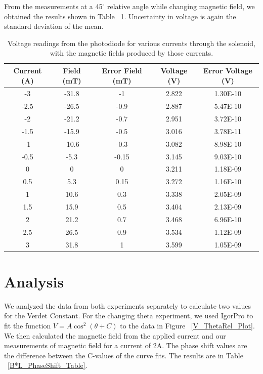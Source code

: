 \documentclass[prb,preprint]{revtex4-1}
\begin{document}
From the measurements at a 45$^{\circ}$ relative angle while changing magnetic field, we obtained the results shown in Table ~\ref{V_I_Table}. Uncertainty in voltage is again the standard deviation of the mean.

\begin{table}[h!]
\centering
\caption{Voltage readings from the photodiode for various currents through the solenoid, with the magnetic fields produced by those currents. }
\begin{ruledtabular}
\begin{tabular}{c c c c c}
Current (A) & Field (mT) & Error Field (mT) & Voltage (V) & Error Voltage (V)\\
\hline	%
-3   & -31.8 & -1 & 2.822 & 1.30E-10 \\
-2.5 & -26.5 & -0.9 & 2.887 & 5.47E-10 \\
-2   & -21.2 & -0.7 & 2.951 & 3.72E-10 \\
-1.5 & -15.9 & -0.5 & 3.016 & 3.78E-11 \\
-1   & -10.6 & -0.3 & 3.082 & 8.98E-10 \\
-0.5 & -5.3 & -0.15 & 3.145 & 9.03E-10 \\
0 & 0 & 0 & 3.211 & 1.18E-09 \\
0.5  & 5.3 & 0.15 & 3.272 & 1.16E-10 \\
1    & 10.6 & 0.3 & 3.338 & 2.05E-09 \\
1.5  & 15.9 & 0.5 & 3.404 & 2.13E-09 \\
2    & 21.2 & 0.7 & 3.468 & 6.96E-10 \\
2.5  & 26.5 & 0.9 & 3.534 & 1.12E-09 \\
3    & 31.8 & 1 & 3.599 & 1.05E-09
\end{tabular}
\end{ruledtabular}
\label{V_I_Table}
\end{table}

\section{Analysis}

We analyzed the data from both experiments separately to calculate two values for the Verdet Constant.  For the changing theta experiment, we used IgorPro to fit the function $V = A \cos ^2 (\theta + C)$ to the data in Figure ~\ref{V_ThetaRel_Plot}.  We then calculated the magnetic field from the applied current and our measurements of magnetic field for a current of 2A. The phase shift values are the difference between the C-values of the curve fits.  The results are in Table ~\ref{B*L_PhaseShift_Table}.  
\end{document}
